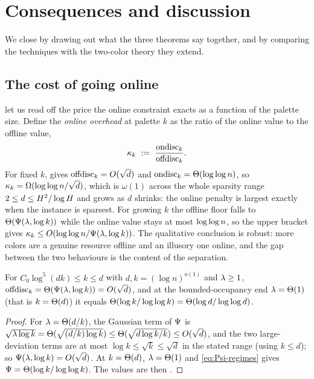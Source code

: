 \section{Consequences and discussion}\label{sec:discussion}

We close by drawing out what the three theorems say together, and by comparing the techniques with the two-color theory they
extend.

\subsection{The cost of going online}\label{sec:disc-cost}

 let us read off the price the online constraint exacts as a function of the palette size. Define
the \emph{online overhead} at palette $k$ as the ratio of the online value to the offline value,
\[
  \kappa_k\ :=\ \frac{\ondisc_k}{\offdisc_k}.
\]
For fixed $k$,  gives $\mathrm{offdisc}_k=O(\sqrt d)$ and $\mathrm{ondisc}_k=\Theta(\log\log n)$, so
$\kappa_k=\Omega(\log\log n/\sqrt d)$, which is $\omega(1)$ across the whole sparsity range $2\le d\le H^2/\log H$ and
grows as $d$ shrinks: the online penalty is largest exactly when the instance is sparsest. For growing $k$ the offline floor
falls to $\Theta(\Psi(\lambda,\log k))$ while the online value stays at most $\log\log n$, so the upper bracket gives
$\kappa_k\le O(\log\log n/\Psi(\lambda,\log k))$. The qualitative conclusion is robust: more colors are a genuine resource
offline and an illusory one online, and the gap between the two behaviours is the content of the separation.

\begin{corollary}\label{cor:offline-mono}
For $C_0\log^5(dk)\le k\le d$ with $d,k=(\log n)^{o(1)}$ and $\lambda\ge1$, $\mathrm{offdisc}_k=\Theta(\Psi(\lambda,\log k))=O(\sqrt d)$,
and at the bounded-occupancy end $\lambda=\Theta(1)$ (that is $k=\Theta(d)$) it equals $\Theta(\log k/\log\log k)=\Theta(\log d/\log\log d)$.
\end{corollary}

\begin{proof}
For $\lambda=\Theta(d/k)$, the Gaussian term of $\Psi$ is $\sqrt{\lambda\log k}=\Theta(\sqrt{(d/k)\log k})\le\Theta(\sqrt{d\log k/k})\le
O(\sqrt d)$, and the two large-deviation terms are at most $\log k\le\sqrt k\le\sqrt d$ in the stated range (using $k\le d$); so
$\Psi(\lambda,\log k)=O(\sqrt d)$. At $k=\Theta(d)$, $\lambda=\Theta(1)$ and \eqref{eq:Psi-regimes} gives
$\Psi=\Theta(\log k/\log\log k)$. The values are then .
\end{proof}

